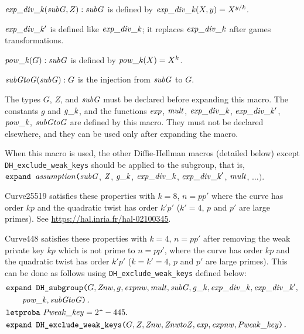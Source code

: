 \documentclass{article}
\begin{document}
\begin{itemize}
\begin{itemize}
\begin{itemize}
       $\mathit{exp\_div\_k}(\mathit{subG},Z):\mathit{subG}$ is defined by $\mathit{exp\_div\_k}(X,y) = X^{y/k}$.
       
       $\mathit{exp\_div\_k'}$ is defined like $\mathit{exp\_div\_k}$; it replaces $\mathit{exp\_div\_k}$ after games transformations.

       $\mathit{pow\_k}(G):\mathit{subG}$ is defined by $\mathit{pow\_k}(X) = X^k$.

       $\mathit{subGtoG}(\mathit{subG}):G$ is the injection from $\mathit{subG}$ to $G$.

       The types $G$, $Z$, and $\mathit{subG}$ must be declared before expanding this macro.
       The constants $g$ and $\mathit{g\_k}$, and the functions $\mathit{exp}$, $\mathit{mult}$, $\mathit{exp\_div\_k}$,
       $\mathit{exp\_div\_k'}$, $\mathit{pow\_k}$, $\mathit{subGtoG}$ are defined by this macro. They must not be
       declared elsewhere, and they can be used only after expanding the
       macro.

       When this macro is used, the other Diffie-Hellman macros (detailed below)
       except \texttt{DH\_exclude\_weak\_keys} should be applied to the subgroup, that is,
       $\texttt{expand\ }\vn{assumption}\texttt{(}\vn{subG}$, $\mathit{Z}$, $\mathit{g\_k}$, $\mathit{exp\_div\_k}$, $\mathit{exp\_div\_k}'$, $\mathit{mult}$, $\dots\texttt{).}$
       
       Curve25519 satisfies these properties with $k = 8$, $n = pp'$ where the curve has order
       $kp$ and the quadratic twist has order $k'p'$ ($k' = 4$, $p$ and $p'$ are large primes). See
       \url{https://hal.inria.fr/hal-02100345}.

       Curve448 satisfies these properties with $k = 4$, $n = pp'$ after removing the weak private key $kp$ which is not prime to $n = pp'$, where the curve has order $kp$ and the quadratic twist 
has order $k'p'$ ($k = k' = 4$, $p$ and $p'$ are large primes). This can be done as follows
using \texttt{DH\_exclude\_weak\_keys} defined below:
\begin{align*}
  &\texttt{expand\ DH\_subgroup(}G, \vn{Znw}, g, \vn{expnw}, \vn{mult}, \vn{subG}, \vn{g\_k}, \vn{exp\_div\_k}, \vn{exp\_div\_k'}, \\
  &\qquad \vn{pow\_k}, \vn{subGtoG}\texttt{).}\\
  &\texttt{letproba}\ \vn{Pweak\_key} = 2\texttt{\string^}-445.\\
  &\texttt{expand\ DH\_exclude\_weak\_keys(}G, Z, \vn{Znw}, \vn{ZnwtoZ}, \vn{exp}, \vn{expnw}, \vn{Pweak\_key}\texttt{).}
\end{align*}


\end{itemize}
\end{itemize}
\end{itemize}
\end{document}
